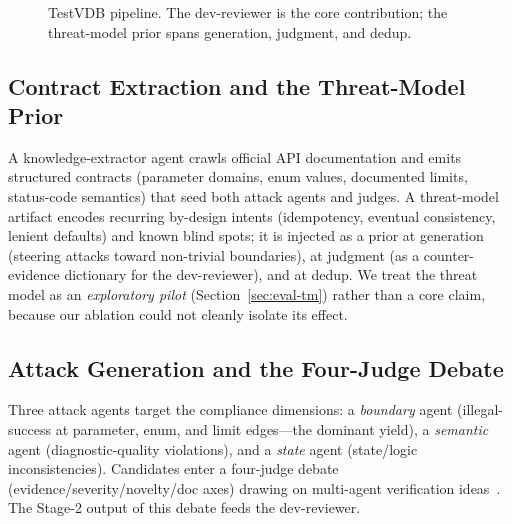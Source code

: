 \documentclass[sigconf]{acmart}
\begin{document}
\begin{figure}[t]
\centering
\caption{TestVDB pipeline. The dev-reviewer is the core contribution; the threat-model prior spans generation, judgment, and dedup.}
\label{fig:overview}
\end{figure}

\subsection{Contract Extraction and the Threat-Model Prior}\label{sec:tm}
A knowledge-extractor agent crawls official API documentation and emits structured contracts (parameter domains, enum values, documented limits, status-code semantics) that seed both attack agents and judges. A threat-model artifact encodes recurring by-design intents (idempotency, eventual consistency, lenient defaults) and known blind spots; it is injected as a prior at generation (steering attacks toward non-trivial boundaries), at judgment (as a counter-evidence dictionary for the dev-reviewer), and at dedup. We treat the threat model as an \emph{exploratory pilot} (Section~\ref{sec:eval-tm}) rather than a core claim, because our ablation could not cleanly isolate its effect.

\subsection{Attack Generation and the Four-Judge Debate}
Three attack agents target the compliance dimensions: a \emph{boundary} agent (illegal-success at parameter, enum, and limit edges---the dominant yield), a \emph{semantic} agent (diagnostic-quality violations), and a \emph{state} agent (state/logic inconsistencies). Candidates enter a four-judge debate (evidence/severity/novelty/doc axes) drawing on multi-agent verification ideas~\cite{du2023improving}. The Stage-2 output of this debate feeds the dev-reviewer.
\end{document}
